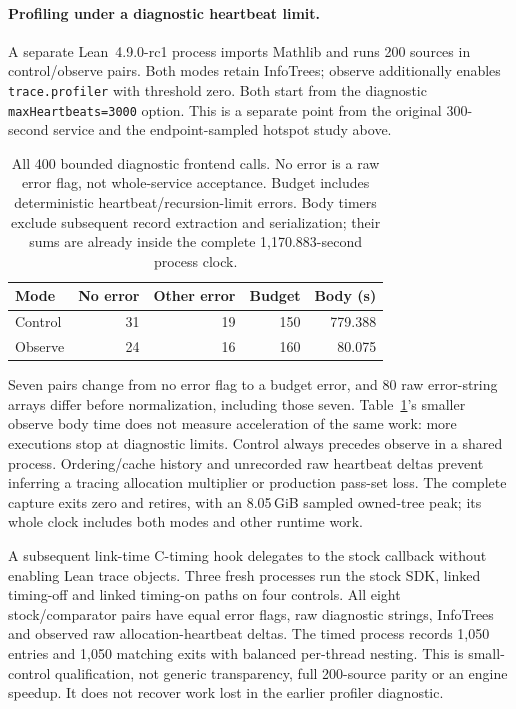 \documentclass[10pt,twocolumn]{article}
\begin{document}
\paragraph{Profiling under a diagnostic heartbeat limit.}
A separate Lean~4.9.0-rc1 process imports Mathlib and runs 200 sources
in control/observe pairs. Both modes retain InfoTrees; observe additionally
enables \texttt{trace.profiler} with threshold zero.
Both start from the diagnostic \texttt{maxHeartbeats=3000} option.
This is a separate point from the original 300-second service and the
endpoint-sampled hotspot study above.

\begin{table}[t]
\centering
\small
\begin{tabular}{@{}lrrrr@{}}
\toprule
Mode & No error & Other error & Budget & Body (s) \\
\midrule
Control & 31 & 19 & 150 & 779.388 \\
Observe & 24 & 16 & 160 & 80.075 \\
\bottomrule
\end{tabular}
\caption{All 400 bounded diagnostic frontend calls. No error is a raw
error flag, not whole-service acceptance. Budget includes deterministic
heartbeat/recursion-limit errors. Body timers exclude subsequent record
extraction and serialization; their sums are already inside the complete
1,170.883-second process clock.}
\label{tab:profiler-diagnostic-limits}
\end{table}

Seven pairs change from no error flag to a budget error, and 80 raw
error-string arrays differ before normalization, including those seven.
Table~\ref{tab:profiler-diagnostic-limits}'s smaller observe body time
does not measure acceleration of the same work: more executions stop at
diagnostic limits. Control always precedes observe in a shared process.
Ordering/cache history and unrecorded raw heartbeat deltas prevent
inferring a tracing allocation multiplier or production pass-set loss.
The complete capture exits zero and retires, with an 8.05\,GiB sampled
owned-tree peak; its whole clock includes both modes and other runtime work.

A subsequent link-time C-timing hook delegates to the stock callback
without enabling Lean trace objects. Three fresh processes run the stock
SDK, linked timing-off and linked timing-on paths on four controls.
All eight stock/comparator pairs have equal error flags, raw diagnostic
strings, InfoTrees and observed raw allocation-heartbeat deltas.
The timed process records 1,050 entries and 1,050 matching exits with
balanced per-thread nesting. This is small-control qualification, not
generic transparency, full 200-source parity or an engine speedup.
It does not recover work lost in the earlier profiler diagnostic.
\end{document}
